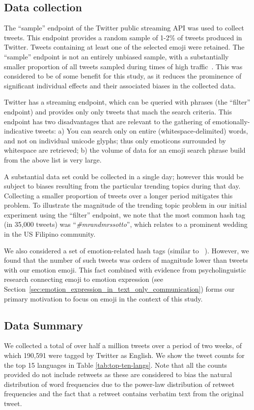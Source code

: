 \documentclass[10pt, a4paper]{article}
\begin{document}
\subsection{Data collection}

The ``sample'' endpoint of the Twitter public streaming API was used to collect tweets. This endpoint provides a random sample of 1-2\% of tweets produced in Twitter.
Tweets containing at least one of the selected emoji were retained. The ``sample'' endpoint is not an entirely unbiased sample, with a substantially smaller proportion of all tweets sampled during times of high traffic~\cite{Morstatter2013Is}. This was considered to be of some benefit for this study, as it reduces the prominence of significant individual effects and their associated biases in the collected data.

Twitter has a streaming endpoint, which can be queried with phrases (the ``filter'' endpoint) and provides only only tweets that mach the search criteria.
This endpoint has two disadvantages that are relevant to the gathering of emotionally-indicative tweets: a) You can search only on entire (whitespace-delimited) words, and not on individual unicode glyphs; thus only emoticons surrounded by whitespace are retrieved; b) the volume of data for an emoji search phrase build from the above list is very large.

A substantial data set could be collected in a single day; however this would be subject to biases resulting from the particular trending topics during that day. 
Collecting a smaller proportion of tweets over a longer period mitigates this problem.
To illustrate the magnitude of the trending topic problem in our initial experiment using the ``filter'' endpoint, we note that the most common hash tag (in 35,000 tweets) was ``\emph{\#mrandmrssotto}'', which relates to a prominent wedding in the US Filipino community.

We also considered a set of emotion-related hash tags (similar to ~\cite{Mohammad2012Emotional}). However, we found that the number of such tweets was orders of magnitude lower than tweets with our emotion emoji. This fact combined with evidence from psycholinguistic research connecting emoji to emotion expression (see Section~\ref{sec:emotion_expression_in_text_only_communication}) forms our primary motivation to focus on emoji in the context of this study.

\subsection{Data Summary}
We collected a total of over half a million tweets over a period of two weeks, of which 190,591 were tagged by Twitter as English. We show the tweet counts for the top 15 languages in Table \ref{tab:top-ten-langs}.
Note that all the counts provided do not include retweets as 
these are considered to bias the natural distribution of word frequencies due to the power-law distribution of retweet frequencies and the fact that a retweet contains verbatim text from the original tweet.
\end{document}
